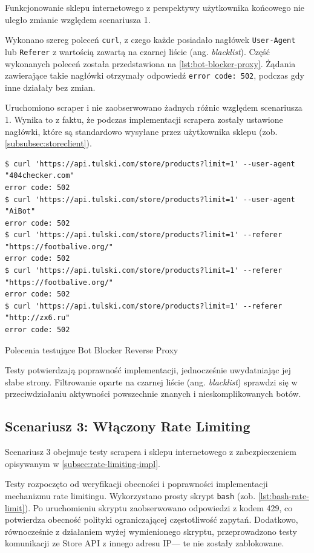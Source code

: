 Funkcjonowanie sklepu internetowego z perspektywy użytkownika końcowego nie uległo zmianie względem scenariusza 1.

Wykonano szereg poleceń \texttt{curl}, z czego każde posiadało nagłówek \texttt{User-Agent} lub \texttt{Referer} z wartością zawartą na czarnej liście (ang. \emph{blacklist}).
Część wykonanych poleceń została przedstawiona na \autoref{lst:bot-blocker-proxy}.
Żądania zawierające takie nagłówki otrzymały odpowiedź \texttt{error code: 502}, podczas gdy inne działały bez zmian.

Uruchomiono scraper i nie zaobserwowano żadnych różnic względem scenariusza 1.
Wynika to z faktu, że podczas implementacji scrapera zostały ustawione nagłówki, które są standardowo wysyłane przez użytkownika sklepu (zob. \autoref{subsubsec:storeclient}).

\begin{listing}[H]
    \begin{verbatim}
$ curl 'https://api.tulski.com/store/products?limit=1' --user-agent "404checker.com"
error code: 502
$ curl 'https://api.tulski.com/store/products?limit=1' --user-agent "AiBot"
error code: 502
$ curl 'https://api.tulski.com/store/products?limit=1' --referer "https://footbalive.org/"
error code: 502
$ curl 'https://api.tulski.com/store/products?limit=1' --referer "https://footbalive.org/"
error code: 502
$ curl 'https://api.tulski.com/store/products?limit=1' --referer "http://zx6.ru"
error code: 502
    \end{verbatim}
    \caption{Polecenia testujące Bot Blocker Reverse Proxy}
    \label{lst:bot-blocker-proxy}
\end{listing}

Testy potwierdzają poprawność implementacji, jednocześnie uwydatniając jej słabe strony.
Filtrowanie oparte na czarnej liście (ang. \emph{blacklist}) sprawdzi się w przeciwdziałaniu aktywności powszechnie znanych i nieskomplikowanych botów.

\subsection{Scenariusz 3: Włączony Rate Limiting}\label{subsec:scenariusz-2:-waczony-rate-limiting}

Scenariusz 3 obejmuje testy scrapera i sklepu internetowego z zabezpieczeniem opisywanym w \autoref{subsec:rate-limiting-impl}.

Testy rozpoczęto od weryfikacji obecności i poprawności implementacji mechanizmu rate limitingu.
Wykorzystano prosty skrypt \texttt{bash} (zob. \autoref{lst:bash-rate-limit}).
Po uruchomieniu skryptu zaobserwowano odpowiedzi z kodem 429, co potwierdza obecność polityki ograniczającej częstotliwość zapytań.
Dodatkowo, równocześnie z działaniem wyżej wymienionego skryptu, przeprowadzono testy komunikacji ze Store API z innego adresu IP\@  --- te nie zostały zablokowane.

